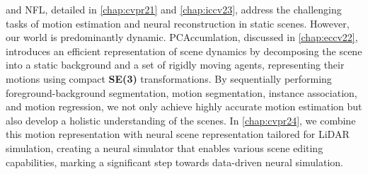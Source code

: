 \acro and NFL, detailed in \cref{chap:cvpr21} and \cref{chap:iccv23},  address the challenging tasks of motion estimation and neural reconstruction in static scenes. However, our world is predominantly dynamic. PCAccumlation, discussed in \cref{chap:eccv22}, introduces an efficient representation of scene dynamics by decomposing the scene into a static background and a set of rigidly moving agents, representing their motions using compact \textbf{SE(3)} transformations. By sequentially performing foreground-background segmentation, motion segmentation, instance association, and motion regression, we not only achieve highly accurate motion estimation but also develop a holistic understanding of the scenes. In \cref{chap:cvpr24}, we combine this motion representation with neural scene representation tailored for LiDAR simulation, creating a neural simulator that enables various scene editing capabilities, marking a significant step towards data-driven neural simulation.











